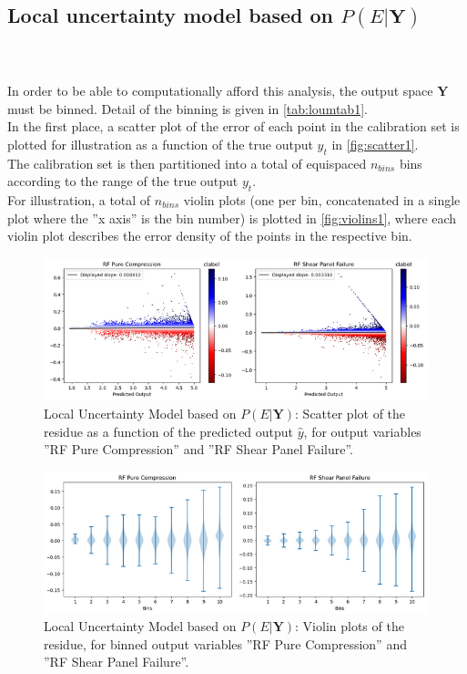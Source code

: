 \FloatBarrier
\subsection{Local uncertainty model based on $P(E|\mathbf{Y})$}
\paragraph{ \\}
In order to be able to computationally afford this analysis, the output space $\mathbf{Y}$ must be binned. Detail of the binning is given in \autoref{tab:loumtab1}.\\
\indent In the first place, a scatter plot of the error of each point in the calibration set is plotted for illustration as a function of the true output $y_t$ in \autoref{fig:scatter1}.\\
\indent The calibration set is then partitioned into a total of equispaced $n_{bins}$ bins according to the range of the true output $y_t$.\\
\indent For illustration, a total of $n_{bins}$ violin plots (one per bin, concatenated in a single plot where the ''x axis'' is the bin number) is plotted in \autoref{fig:violins1}, where each violin plot describes the error density of the points in the respective bin.\\
%
\begin{figure}[!htb]
	\centering
	\includegraphics[width=\textwidth]{Figures/uncertainty/scatter1.png}
	\caption{Local Uncertainty Model based on $P(E|\mathbf{Y})$: Scatter plot of the residue as a function of the predicted output $\hat{y}$, for output variables ''RF Pure Compression'' and ''RF Shear Panel Failure''.}
	\label{fig:scatter1}
\end{figure}
\begin{figure}[!htb]
	\centering
	\includegraphics[width=\textwidth]{Figures/uncertainty/violines1.png}
	\caption{Local Uncertainty Model based on $P(E|\mathbf{Y})$: Violin plots of the residue, for binned output variables ''RF Pure Compression'' and ''RF Shear Panel Failure''.}
	\label{fig:violins1}
\end{figure}

